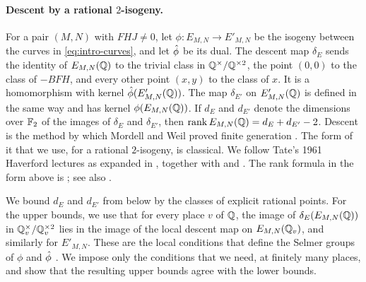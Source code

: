 \paragraph{Descent by a rational $2$-isogeny.} For a pair $(M,N)$ with $FHJ\ne0$, let $\phi\colon E_{M,N}\to E'_{M,N}$ be the isogeny between the curves in \eqref{eq:intro-curves}, and let $\hat\phi$ be its dual. The descent map $\delta_E$ sends the identity of $E_{M,N}(\mathbb Q)$ to the trivial class in $\mathbb Q^{\times}/\mathbb Q^{\times2}$, the point $(0,0)$ to the class of $-BFH$, and every other point $(x,y)$ to the class of $x$. It is a homomorphism with kernel $\hat\phi(E'_{M,N}(\mathbb Q))$. The map $\delta_{E'}$ on $E'_{M,N}(\mathbb Q)$ is defined in the same way and has kernel $\phi(E_{M,N}(\mathbb Q))$. If $d_E$ and $d_{E'}$ denote the dimensions over $\mathbb F_2$ of the images of $\delta_E$ and $\delta_{E'}$, then $\operatorname{rank} E_{M,N}(\mathbb Q)=d_E+d_{E'}-2$. Descent is the method by which Mordell and Weil proved finite generation \cite{Mordell1922,Weil1929}. The form of it that we use, for a rational $2$-isogeny, is classical. We follow Tate's 1961 Haverford lectures as expanded in \cite[\S\S3.4--3.6]{SilvermanTate2015}, together with \cite[Example~X.4.8 and Proposition~X.4.9]{SilvermanAEC} and \cite[\S14]{Cassels1991}. The rank formula in the form above is \cite[Lemma~3.1]{Zywina2026}; see also \cite[\S3.6]{SilvermanTate2015}.

We bound $d_E$ and $d_{E'}$ from below by the classes of explicit rational points. For the upper bounds, we use that for every place $v$ of $\mathbb Q$, the image of $\delta_E(E_{M,N}(\mathbb Q))$ in $\mathbb Q_v^{\times}/\mathbb Q_v^{\times2}$ lies in the image of the local descent map on $E_{M,N}(\mathbb Q_v)$, and similarly for $E'_{M,N}$. These are the local conditions that define the Selmer groups of $\phi$ and $\hat\phi$ \cite[\S X.4]{SilvermanAEC}. We impose only the conditions that we need, at finitely many places, and show that the resulting upper bounds agree with the lower bounds.

